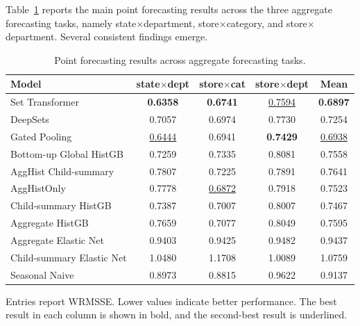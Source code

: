 \documentclass[12pt]{article}
\begin{document}
Table~\ref{tab:main_point} reports the main point forecasting results across the three aggregate forecasting tasks, namely state$\times$department, store$\times$category, and store$\times$department. Several consistent findings emerge.

\begin{table}[H]
  \centering
  \caption{Point forecasting results across aggregate forecasting tasks.}
  \label{tab:main_point}
  \begin{threeparttable}
    \begin{tabular}{lcccc}
      \toprule
      Model                     & state$\times$dept  & store$\times$cat   & store$\times$dept  & Mean               \\
      \midrule
      Set Transformer                  & \textbf{0.6358}    & \textbf{0.6741}    & \underline{0.7594} & \textbf{0.6897}    \\
      DeepSets                  & 0.7057             & 0.6974             & 0.7730             & 0.7254             \\
      Gated Pooling                  & \underline{0.6444} & 0.6941             & \textbf{0.7429}    & \underline{0.6938} \\
      Bottom-up Global HistGB  & 0.7259	      & 0.7335            	& 0.8081	           & 0.7558             \\
      AggHist Child-summary   & 0.7807             & 0.7225             & 0.7891             & 0.7641             \\
      AggHistOnly               & 0.7778             & \underline{0.6872} & 0.7918             & 0.7523             \\
      Child-summary HistGB      & 0.7387             & 0.7007             & 0.8007             & 0.7467             \\
      Aggregate HistGB          & 0.7659             & 0.7077             & 0.8049             & 0.7595             \\
      Aggregate Elastic Net     & 0.9403             & 0.9425             & 0.9482             & 0.9437             \\
      Child-summary Elastic Net & 1.0480             & 1.1708             & 1.0089             & 1.0759             \\
      Seasonal Naive            & 0.8973             & 0.8815             & 0.9622             & 0.9137             \\
      \bottomrule
    \end{tabular}
    \begin{tablenotes}
      \footnotesize \item Entries report WRMSSE. Lower values indicate better performance. The best result in each column is shown in bold, and the second-best result is underlined.
    \end{tablenotes}
  \end{threeparttable}
\end{table}
\end{document}
